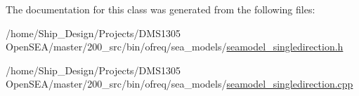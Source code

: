 The documentation for this class was generated from the following files\-:\begin{DoxyCompactItemize}
\item 
/home/\-Ship\-\_\-\-Design/\-Projects/\-D\-M\-S1305 Open\-S\-E\-A/master/200\-\_\-src/bin/ofreq/sea\-\_\-models/\hyperlink{seamodel__singledirection_8h}{seamodel\-\_\-singledirection.\-h}\item 
/home/\-Ship\-\_\-\-Design/\-Projects/\-D\-M\-S1305 Open\-S\-E\-A/master/200\-\_\-src/bin/ofreq/sea\-\_\-models/\hyperlink{seamodel__singledirection_8cpp}{seamodel\-\_\-singledirection.\-cpp}\end{DoxyCompactItemize}
